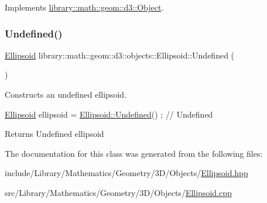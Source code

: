 Implements \hyperlink{classlibrary_1_1math_1_1geom_1_1d3_1_1_object_aa166f4ce4d116a248f0fc861c75012ca}{library\+::math\+::geom\+::d3\+::\+Object}.

\mbox{\label{classlibrary_1_1math_1_1geom_1_1d3_1_1objects_1_1_ellipsoid_affcef36f736e6d21a0246a149b8fb688}} 
\subsubsection{\texorpdfstring{Undefined()}{Undefined()}}
{\footnotesize\ttfamily \hyperlink{classlibrary_1_1math_1_1geom_1_1d3_1_1objects_1_1_ellipsoid}{Ellipsoid} library\+::math\+::geom\+::d3\+::objects\+::\+Ellipsoid\+::\+Undefined (\begin{DoxyParamCaption}{ }\end{DoxyParamCaption})\hspace{0.3cm}{\ttfamily [static]}}



Constructs an undefined ellipsoid. 


\begin{DoxyCode}
\hyperlink{classlibrary_1_1math_1_1geom_1_1d3_1_1objects_1_1_ellipsoid_aae81fe0edc7f0e8d4590ea89ae73cb14}{Ellipsoid} ellipsoid = \hyperlink{classlibrary_1_1math_1_1geom_1_1d3_1_1objects_1_1_ellipsoid_affcef36f736e6d21a0246a149b8fb688}{Ellipsoid::Undefined}() ; \textcolor{comment}{// Undefined}
\end{DoxyCode}


\begin{DoxyReturn}{Returns}
Undefined ellipsoid 
\end{DoxyReturn}


The documentation for this class was generated from the following files\+:\begin{DoxyCompactItemize}
\item 
include/\+Library/\+Mathematics/\+Geometry/3\+D/\+Objects/\hyperlink{_ellipsoid_8hpp}{Ellipsoid.\+hpp}\item 
src/\+Library/\+Mathematics/\+Geometry/3\+D/\+Objects/\hyperlink{_ellipsoid_8cpp}{Ellipsoid.\+cpp}\end{DoxyCompactItemize}
